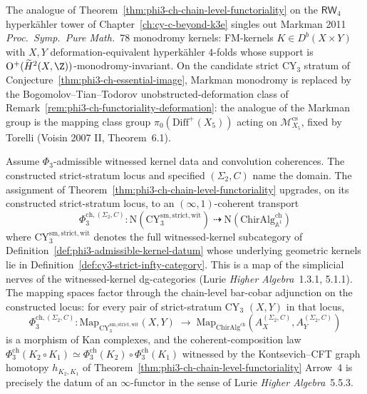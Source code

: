 \begin{remark}
\label{rem:phi3-ch-markman-monodromy}
The analogue of Theorem~\ref{thm:phi3-ch-chain-level-functoriality} on the $\mathsf{RW}_4$ hyperk\"ahler tower of Chapter~\ref{ch:cy-c-beyond-k3e} singles out Markman 2011 \textit{Proc.~Symp.~Pure Math.}~78 monodromy kernels: FM-kernels $K \in D^b(X \times Y)$ with $X, Y$ deformation-equivalent hyperk\"ahler $4$-folds whose support is $\mathrm{O}^+(\widetilde{H}^2(X, \Z))$-monodromy-invariant. On the candidate strict CY$_3$ stratum of Conjecture~\ref{thm:phi3-ch-essential-image}, Markman monodromy is replaced by the Bogomolov--Tian--Todorov unobstructed-deformation class of Remark~\ref{rem:phi3-ch-functoriality-deformation}: the analogue of the Markman group is the mapping class group $\pi_0(\mathrm{Diff}^+(X_5))$ acting on $\mathcal{M}_{X_5}^{\mathrm{cs}}$, fixed by Torelli (Voisin 2007 II, Theorem~6.1).
\end{remark}

\begin{corollary}
\label{cor:phi3-ch-infinity-functor}
Assume $\Phi_3$-admissible witnessed kernel data and convolution
coherences. The constructed strict-stratum locus and specified
$(\Sigma_2,C)$ name the domain.
The assignment of Theorem~\ref{thm:phi3-ch-chain-level-functoriality} upgrades, on its constructed strict-stratum locus, to an $(\infty,1)$-coherent transport
\[
\Phi_3^{\mathrm{ch},(\Sigma_2,C)} \colon \mathrm{N}(\mathrm{CY}_3^{\mathrm{sm,strict,wit}}) \;\dashrightarrow\; \mathrm{N}(\mathrm{ChirAlg}^{\mathrm{ch}}_{\mathbb{A}^1})
\]
where $\mathrm{CY}_3^{\mathrm{sm,strict,wit}}$ denotes the full witnessed-kernel subcategory of Definition~\ref{def:phi3-admissible-kernel-datum} whose underlying geometric kernels lie in Definition~\ref{def:cy3-strict-infty-category}. This is a map of the simplicial nerves of the witnessed-kernel dg-categories (Lurie \textit{Higher Algebra}~1.3.1, 5.1.1). The mapping spaces factor through the chain-level bar-cobar adjunction on the constructed locus: for every pair of strict-stratum CY$_3$ $(X, Y)$ in that locus,
\[
 \Phi_3^{\mathrm{ch},(\Sigma_2,C)} \colon \mathrm{Map}_{\mathrm{CY}_3^{\mathrm{sm,strict,wit}}}(X, Y) \;\longrightarrow\; \mathrm{Map}_{\mathrm{ChirAlg}^{\mathrm{ch}}}(A_X^{(\Sigma_2,C)}, A_Y^{(\Sigma_2,C)})
\]
is a morphism of Kan complexes, and the coherent-composition law $\Phi_3^{\mathrm{ch}}(K_2 \circ K_1) \simeq \Phi_3^{\mathrm{ch}}(K_2) \circ \Phi_3^{\mathrm{ch}}(K_1)$ witnessed by the Kontsevich--CFT graph homotopy $h_{K_2, K_1}$ of Theorem~\ref{thm:phi3-ch-chain-level-functoriality} Arrow~4 is precisely the datum of an $\infty$-functor in the sense of Lurie \textit{Higher Algebra}~5.5.3.
\end{corollary}

